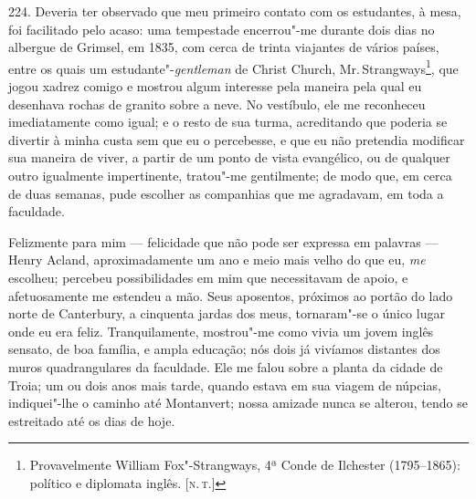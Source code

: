 224. Deveria ter observado que meu primeiro contato com os estudantes, à
mesa, foi facilitado pelo acaso: uma tempestade encerrou"-me durante dois
dias no albergue de Grimsel, em 1835, com cerca de trinta viajantes de
vários países, entre os quais um estudante"-\emph{gentleman} de Christ
Church, Mr.\,Strangways\footnote{Provavelmente William Fox"-Strangways, 4ª
  Conde de Ilchester (1795--1865): político e diplomata inglês. {[}\textsc{n.\,t.}{]}}, que jogou xadrez comigo e mostrou algum interesse pela
maneira pela qual eu desenhava rochas de granito sobre a neve. No
vestíbulo, ele me reconheceu imediatamente como igual; e o resto de sua
turma, acreditando que poderia se divertir à minha custa sem que eu o
percebesse, e que eu não pretendia modificar sua maneira de viver, a
partir de um ponto de vista evangélico, ou de qualquer outro igualmente
impertinente, tratou"-me gentilmente; de modo que, em cerca de duas
semanas, pude escolher as companhias que me agradavam, em toda a
faculdade.

Felizmente para mim --- felicidade que não pode ser expressa em palavras
--- Henry Acland, aproximadamente um ano e meio mais velho do que eu,
\emph{me} escolheu; percebeu possibilidades em mim que necessitavam de
apoio, e afetuosamente me estendeu a mão. Seus aposentos, próximos ao
portão do lado norte de Canterbury, a cinquenta jardas dos meus,
tornaram"-se o único lugar onde eu era feliz. Tranquilamente, mostrou"-me
como vivia um jovem inglês sensato, de boa família, e ampla educação;
nós dois já vivíamos distantes dos muros quadrangulares da faculdade.
Ele me falou sobre a planta da cidade de Troia; um ou dois anos mais
tarde, quando estava em sua viagem de núpcias, indiquei"-lhe o caminho
até Montanvert; nossa amizade nunca se alterou, tendo se estreitado até
os dias de hoje.

